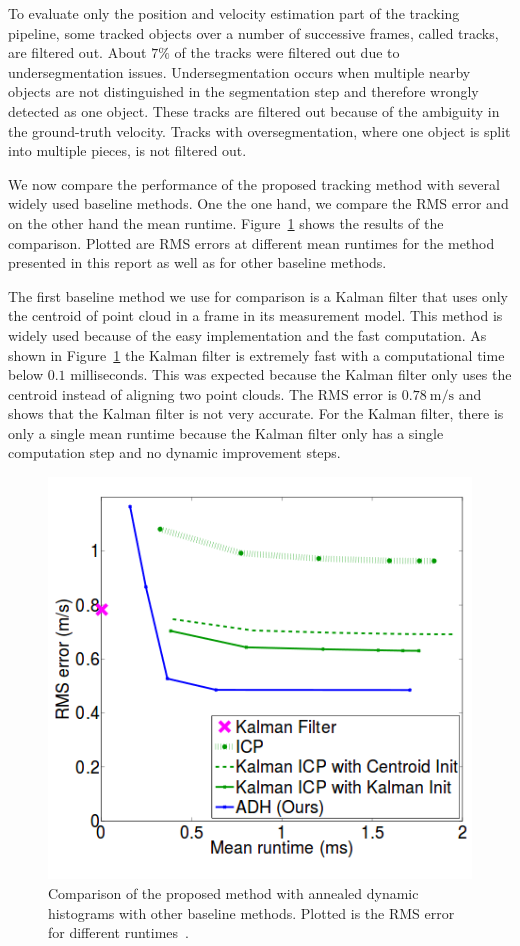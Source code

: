 \documentclass[twoside,a4paper,article]{combine}
\begin{document}
To evaluate only the position and velocity estimation part of the
tracking pipeline, some tracked objects over a number of successive
frames, called tracks, are filtered out. About $7\%$ of the tracks
were filtered out due to undersegmentation issues. Undersegmentation
occurs when multiple nearby objects are not distinguished in the
segmentation step and therefore wrongly detected as one object. These
tracks are filtered out because of the ambiguity in the ground-truth
velocity. Tracks with oversegmentation, where one object is split into
multiple pieces, is not filtered out.

We now compare the performance of the proposed tracking method with
several widely used baseline methods. One the one hand, we compare the
RMS error and on the other hand the mean runtime.
Figure~\ref{fig:rms-runtime} shows the results of the
comparison. Plotted are RMS errors at different mean runtimes for the
method presented in this report as well as for other baseline methods.

The first baseline method we use for comparison is a Kalman filter that
uses only the centroid of point cloud in a frame in its measurement
model. This method is widely used because of the easy implementation
and the fast computation. As shown in Figure~\ref{fig:rms-runtime} the
Kalman filter is extremely fast with a computational time below $0.1$
milliseconds. This was expected because the Kalman filter only uses
the centroid instead of aligning two point clouds. The RMS error is
$0.78 \mathrm{~m/s}$ and shows that the Kalman filter is not very
accurate. For the Kalman filter, there is only a single mean runtime
because the Kalman filter only has a single computation step and no
dynamic improvement steps.

\begin{figure}
  \center
  \includegraphics[width=.45\linewidth]{rms-vs-runtime}
  \caption{Comparison of the proposed method with annealed dynamic
    histograms with other baseline methods. Plotted is the RMS error
    for different runtimes~\cite{paper}.}
  \label{fig:rms-runtime}
\end{figure}
\end{document}
